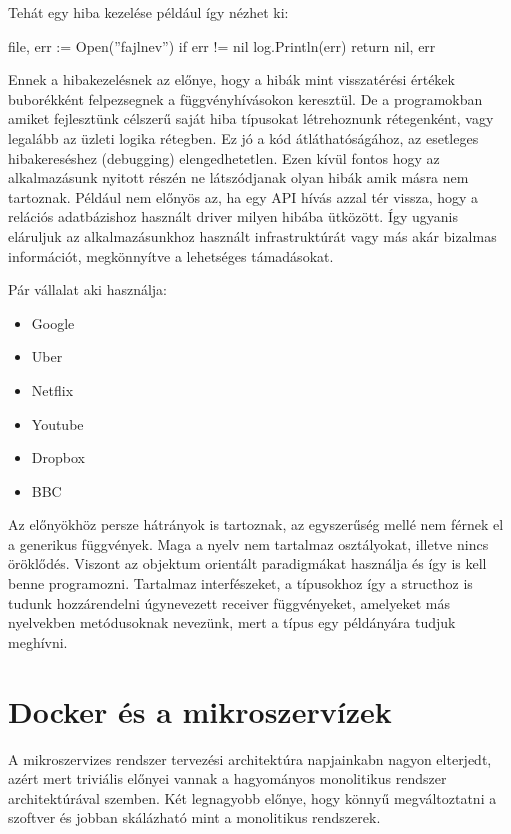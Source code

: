 Tehát egy hiba kezelése például így nézhet ki:
\begin{python}
    file, err := Open(''fajlnev'')
    if err != nil {
        log.Println(err)
        return nil, err
    }
\end{python}

Ennek a hibakezelésnek az előnye, hogy a hibák mint visszatérési értékek buborékként felpezsegnek a függvényhívásokon keresztül.
De a programokban amiket fejlesztünk célszerű saját hiba típusokat létrehoznunk rétegenként, vagy legalább az üzleti logika rétegben. Ez jó a kód átláthatóságához,
az esetleges hibakereséshez (debugging) elengedhetetlen. Ezen kívül fontos hogy az alkalmazásunk nyitott részén ne látszódjanak olyan hibák amik másra nem tartoznak. Például nem előnyös az, ha egy API hívás azzal tér vissza, hogy
a relációs adatbázishoz használt driver milyen hibába ütközött. Így ugyanis eláruljuk az alkalmazásunkhoz használt infrastruktúrát vagy más akár bizalmas információt, megkönnyítve a lehetséges támadásokat.

Pár vállalat aki használja:
\begin{itemize}
    \item Google
    \item Uber
    \item Netflix
    \item Youtube
    \item Dropbox
    \item BBC
\end{itemize}

Az előnyökhöz persze hátrányok is tartoznak, az egyszerűség mellé nem férnek el a generikus függvények.
Maga a nyelv nem tartalmaz osztályokat, illetve nincs öröklődés.
Viszont az objektum orientált paradigmákat használja és így is kell benne programozni.
Tartalmaz interfészeket, a típusokhoz így a structhoz is tudunk hozzárendelni úgynevezett receiver függvényeket, amelyeket más nyelvekben metódusoknak nevezünk, mert a típus egy példányára tudjuk meghívni.

\section{Docker és a mikroszervízek}

A mikroszervizes rendszer tervezési architektúra napjainkabn nagyon elterjedt, azért mert triviális előnyei vannak a hagyományos monolitikus rendszer architektúrával szemben.
Két legnagyobb előnye, hogy könnyű megváltoztatni a szoftver és jobban skálázható mint a monolitikus rendszerek.\\

